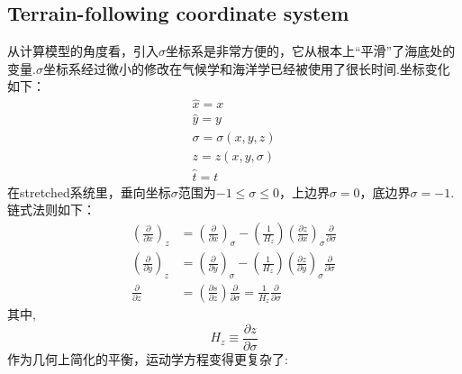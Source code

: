 \documentclass[a3paper,12pt]{article}
\begin{document}
    \subsection{Terrain-following coordinate system}
    从计算模型的角度看，引入$\sigma$坐标系是非常方便的，它从根本上“平滑”了海底处的变量.$\sigma$坐标系经过微小的修改在气候学和海洋学已经被使用了很长时间.坐标变化如下：
    \[
        \begin{array}{c}
            \hat{x}=x \\
            \hat{y}=y \\
            \sigma=\sigma(x, y, z) \\
            z=z(x, y, \sigma) \\
            \hat{t}=t
            \end{array}
    \]
    在stretched系统里，垂向坐标$\sigma$范围为$-1\leq\sigma\leq 0$，上边界$\sigma=0$，底边界$\sigma=-1$.链式法则如下：
    \[
        \begin{aligned}
            \left(\frac{\partial}{\partial x}\right)_{z}&=\left(\frac{\partial}{\partial x}\right)_{\sigma}-\left(\frac{1}{H_{z}}\right)\left(\frac{\partial z}{\partial x}\right)_{\sigma} \frac{\partial}{\partial \sigma} \\
            \left(\frac{\partial}{\partial y}\right)_{z}&=\left(\frac{\partial}{\partial y}\right)_{\sigma}-\left(\frac{1}{H_{z}}\right)\left(\frac{\partial z}{\partial y}\right)_{\sigma} \frac{\partial}{\partial \sigma} \\
            \frac{\partial}{\partial z}&=\left(\frac{\partial s}{\partial z}\right) \frac{\partial}{\partial \sigma}=\frac{1}{H_{z}} \frac{\partial}{\partial \sigma}
            \end{aligned}
    \]
    其中,
    \[
        H_z\equiv\frac{\partial z}{\partial \sigma}
    \]
    作为几何上简化的平衡，运动学方程变得更复杂了:
\end{document}
